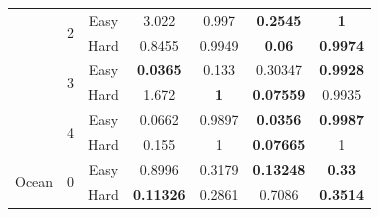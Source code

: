 \documentclass[conference]{IEEEtran}
\begin{document}
\begin{table}[h]
\begin{center}
\begin{tabular}{ccccccc}
                                   &  \multirow{2}{*}{2}   &  \multicolumn{1}{c}{Easy}  & \multicolumn{1}{c}{3.022} & \multicolumn{1}{c}{0.997} & \multicolumn{1}{c}{\textbf{0.2545}}  & \multicolumn{1}{c}{\textbf{1}}   \\
  \cline{3-7}
                                                          & \multicolumn{1}{c}{} &  \multicolumn{1}{c}{Hard}  & \multicolumn{1}{c}{0.8455} & \multicolumn{1}{c}{0.9949} & \multicolumn{1}{c}{\textbf{0.06}}  & \multicolumn{1}{c}{\textbf{0.9974}}   \\
  \cline{2-7}
                                    &  \multirow{2}{*}{3}   &  \multicolumn{1}{c}{Easy}  & \multicolumn{1}{c}{\textbf{0.0365}} & \multicolumn{1}{c}{0.133} & \multicolumn{1}{c}{0.30347}  & \multicolumn{1}{c}{\textbf{0.9928}}   \\
  \cline{3-7}
                                                          & \multicolumn{1}{c}{} &  \multicolumn{1}{c}{Hard}  & \multicolumn{1}{c}{1.672} & \multicolumn{1}{c}{\textbf{1}} & \multicolumn{1}{c}{\textbf{0.07559}}  & \multicolumn{1}{c}{0.9935}   \\
  \cline{2-7}
                                    &  \multirow{2}{*}{4}   &  \multicolumn{1}{c}{Easy}  & \multicolumn{1}{c}{0.0662} & \multicolumn{1}{c}{0.9897} & \multicolumn{1}{c}{\textbf{0.0356}}  & \multicolumn{1}{c}{\textbf{0.9987}}   \\
  \cline{3-7}
                                                          & \multicolumn{1}{c}{} &  \multicolumn{1}{c}{Hard}  & \multicolumn{1}{c}{0.155} & \multicolumn{1}{c}{1} & \multicolumn{1}{c}{\textbf{0.07665}}  & \multicolumn{1}{c}{1}   \\
 \cline{1-7}

\multirow{8}{*}{Ocean}   &  \multirow{2}{*}{0}   &  \multicolumn{1}{c}{Easy}  & \multicolumn{1}{c}{0.8996} & \multicolumn{1}{c}{0.3179} & \multicolumn{1}{c}{\textbf{0.13248}}  & \multicolumn{1}{c}{\textbf{0.33}  } \\
  \cline{3-7}

                                                         & \multicolumn{1}{c}{}  &  \multicolumn{1}{c}{Hard}  & \multicolumn{1}{c}{\textbf{0.11326}} & \multicolumn{1}{c}{0.2861} & \multicolumn{1}{c}{0.7086}  & \multicolumn{1}{c}{\textbf{0.3514}}   \\
  \cline{2-7}


\end{tabular}
\end{center}
\end{table}
\end{document}
